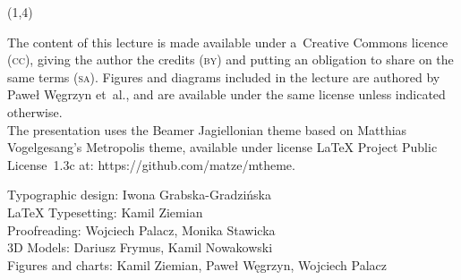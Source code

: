 {\begin{frame}[standout]
\begin{textblock}{4.2}
    \end{textblock}





    \begin{textblock}{11}(1,4)

      \begin{flushleft}

        \mdseries

        \footnotesize

        \RaggedRight

        \color{jFrametitleFGColor}

        The content of this lecture is made available under a~Creative
        Commons licence (\textsc{cc}), giving the author the credits
        (\textsc{by}) and putting an obligation to share on the same terms
        (\textsc{sa}). Figures and diagrams included in the lecture are
        authored by Paweł Węgrzyn et~al., and are available under the same
        license unless indicated otherwise.\\ The presentation uses the
        Beamer Jagiellonian theme based on Matthias Vogelgesang’s
        Metropolis theme, available under license \LaTeX{} Project
        Public License~1.3c at: 
        {https://github.com/matze/mtheme}.

        Typographic design: Iwona Grabska-Gradzińska \\
        \LaTeX{} Typesetting: Kamil Ziemian \\
        Proofreading: Wojciech Palacz,
        Monika Stawicka \\
        3D Models: Dariusz Frymus, Kamil Nowakowski \\
        Figures and charts: Kamil Ziemian, Paweł Węgrzyn, Wojciech Palacz

      \end{flushleft}

    \end{textblock}

  \end{frame}





  \begin{frame}[standout]

    \begingroup

    \color{jFrametitleFGColor}

    #1

    \endgroup

  \end{frame}
}



